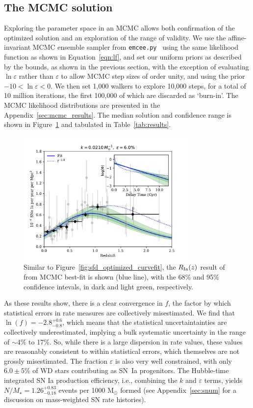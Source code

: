 \documentclass[apj, twocolumn]{aastex62}
\begin{document}
\subsection{The MCMC solution\label{sec:mcmc_sfd}}
Exploring the parameter space in an MCMC allows both confirmation of the optimized solution and an exploration of the range of validity. We use the affine-invariant MCMC ensemble sampler from {\tt emcee.py}~\citep{Foreman-Mackey:2013pd} using the same likelihood function as shown in Equation~\ref{eqn:lf}, and set our uniform priors as described by the bounds, as shown in the previous section, with the exception of evaluating $\ln \varepsilon$ rather than $\varepsilon$ to allow MCMC step sizes of order unity, and using the prior $ -10 < \ln \varepsilon < 0$. We then set 1,000 walkers to explore 10,000 steps, for a total of 10 million iterations, the first 100,000 of which are discarded as `burn-in'. The MCMC likelihood distributions are presented in the Appendix~\ref{sec:mcmc_results}. The median solution and confidence range is shown in Figure~\ref{fig:figure_fit_demo_werr} and tabulated in Table~\ref{tab:results}.
\begin{figure}[t]
   \centering
   \includegraphics[width=3.5in]{figure_fit_demo_werr.pdf} 
   \caption{\footnotesize Similar to Figure~\ref{fig:sfd_optimized_curvefit}, the $R_{\rm Ia}(z)$ result of from MCMC best-fit is shown (blue line), with the 68\% and 95\% confidence intevals, in dark and light green, respectively. }
   \label{fig:figure_fit_demo_werr}
\end{figure}

As these results show, there is a clear convergence in $f$, the factor by which statistical errors in rate measures are collectively misestimated. We find that $\ln(f) =-2.8^{+0.6}_{-0.8}$, which means that the statistical uncertaintainties are collectively underestimated, implying a bulk systematic uncertainty in the range of $\sim4\%$ to 17\%. So, while there is a large dispersion in rate values, these values are reasonably consistent to within statistical errors, which themselves are not grossly misestimated. The fraction $\varepsilon$ is also very well constrained, with only $6.0\pm5\%$ of WD stars contributing as SN~Ia progenitors. The Hubble-time integrated SN Ia production efficiency, i.e., combining the $k$ and $\varepsilon$ terms, yields $N/M_{\star}=1.26^{+0.83}_{-0.18}$ events per 1000 M$_{\odot}$ formed (see Appendix~\ref{sec:snum} for a discussion on mass-weighted SN rate histories).
\end{document}
